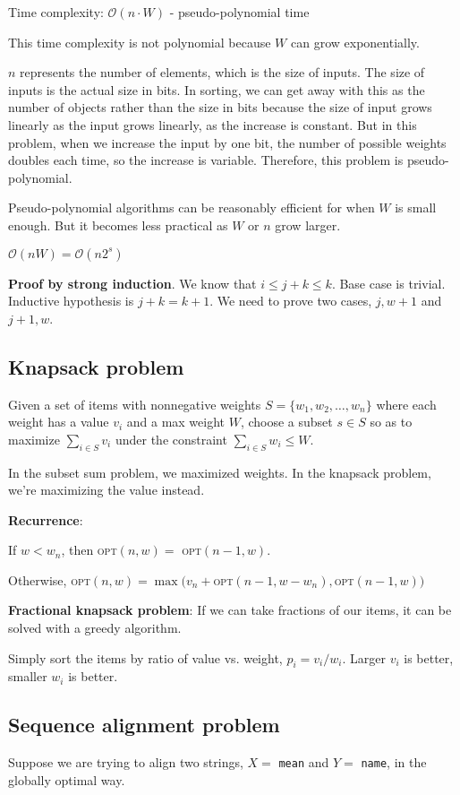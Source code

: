 \documentclass{article}
\newcommand{\Oh}{\mathcal{O}}
\newcommand{\OPT}{\textsc{opt}}
\begin{document}
Time complexity: $\Oh(n \cdot W)$ - pseudo-polynomial time

This time complexity is not polynomial because $W$ can grow exponentially.

$n$ represents the number of elements, which is the size of inputs. The size of inputs is the actual size in bits. In sorting, we can get away with this as the number of objects rather than the size in bits because the size of input grows linearly as the input grows linearly, as the increase is constant. But in this problem, when we increase the input by one bit, the number of possible weights doubles each time, so the increase is variable. Therefore, this problem is pseudo-polynomial.

Pseudo-polynomial algorithms can be reasonably efficient for when $W$ is small enough. But it becomes less practical as $W$ or $n$ grow larger.

$\Oh(nW) = \Oh(n2^s)$

\textbf{Proof by strong induction}. We know that $i \leq j + k \leq k$. Base case is trivial. Inductive hypothesis is $j + k = k + 1$. We need to prove two cases, $j, w+1$ and $j+1, w$.

\subsection{Knapsack problem}
Given a set of items with nonnegative weights $S = \{w_1, w_2, \dots, w_n\}$ where each weight has a value $v_i$ and a max weight $W$, choose a subset $s \in S$ so as to maximize $\sum_{i \in S} v_i$ under the constraint $\sum_{i \in S} w_i \leq W$.

In the subset sum problem, we maximized weights. In the knapsack problem, we're maximizing the value instead.

\textbf{Recurrence}:

If $w < w_n$, then \OPT$(n, w) =$ \OPT$(n - 1, w)$.

Otherwise, \OPT$(n, w) = \max(v_n + $\OPT$(n - 1, w - w_n), $\OPT$(n - 1, w))$

\textbf{Fractional knapsack problem}: If we can take fractions of our items, it can be solved with a greedy algorithm.

Simply sort the items by ratio of value vs. weight, $p_i = v_i / w_i$. Larger $v_i$ is better, smaller $w_i$ is better.

\subsection{Sequence alignment problem}
Suppose we are trying to align two strings, $X =$ \texttt{mean} and $Y =$ \texttt{name}, in the globally optimal way.
\end{document}
